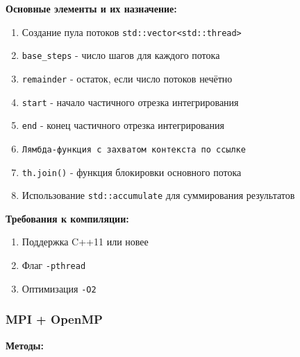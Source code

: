 \documentclass[14pt,a4paper]{article}
\begin{document}
\textbf{Основные элементы и их назначение:}
\begin{enumerate}
\item Создание пула потоков \texttt{std::vector<std::thread>}
\item \texttt{base\_steps} - число шагов для каждого потока
\item \texttt{remainder} - остаток, если число потоков нечётно
\item \texttt{start} - начало частичного отрезка интегрирования
\item \texttt{end} - конец частичного отрезка интегрирования
\item  \texttt{Лямбда-функция с захватом контекста по ссылке}
\item \texttt{th.join()} - функция блокировки основного потока
\item Использование \texttt{std::accumulate} для суммирования результатов
\end{enumerate}

\textbf{Требования к компиляции:}
\begin{enumerate}
\item Поддержка C++11 или новее
\item Флаг \texttt{-pthread}
\item Оптимизация \texttt{-O2}
\end{enumerate}

\subsubsection{MPI + OpenMP}
\textbf{Методы:}
\end{document}
